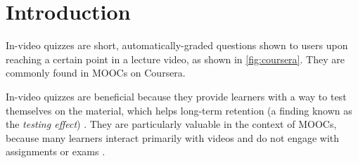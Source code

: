 \documentclass{sigchi}
\begin{document}
\begin{abstract}

\end{abstract}



\section{Introduction}

In-video quizzes are short, automatically-graded questions shown to users upon reaching a certain point in a lecture video, as shown in \autoref{fig:coursera}. They are commonly found in MOOCs on Coursera. %

In-video quizzes are beneficial because they provide learners with a way to test themselves on the material, which helps long-term retention (a finding known as the \emph{testing effect}) \cite{testingeffect}. They are particularly valuable in the context of MOOCs, because many learners interact primarily with videos and do not engage with assignments or exams \cite{renedisengagement} \cite{ashton}.
\end{document}
